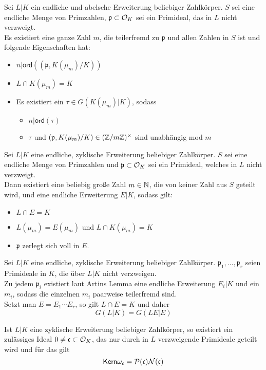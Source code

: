 \documentclass{book}
\newcommand{\Nc}{\mathcal{N}}
\newcommand{\cf}{\mathfrak{c}}
\newcommand{\pf}{\mathfrak{p}}
\begin{document}
\Lem{}
Sei $L|K$ ein endliche und abelsche Erweiterung beliebiger Zahlkörper. $S$ sei eine endliche Menge von Primzahlen, $\pf \subset \O_K$ sei ein Primideal, das in $L$ nicht verzweigt.\\
Es existiert eine ganze Zahl $m$, die teilerfremd zu $\pf$ und allen Zahlen in $S$ ist und folgende Eigenschaften hat:
\begin{itemize}
\item $n | \textsf{ord}((\pf, K(\mu_m) / K))$
\item $L\cap K(\mu_m) = K$
\item Es existiert ein $\tau \in G(K(\mu_m) | K)$, sodass
\begin{itemize}
\item $n|\textsf{ord}(\tau)$
\item $\tau$ und $(\pf, K(\mu_m)/K) \in (\Z/m\Z)^\times$ sind unabhängig mod $m$
\end{itemize}
\end{itemize} 

Sei $L|K$ eine endliche, zyklische Erweiterung beliebiger Zahlkörper. $S$ sei eine endliche Menge von Primzahlen und $\pf \subset \O_K$ sei ein Primideal, welches in $L$ nicht verzweigt.\\
Dann existiert eine beliebig große Zahl $m \in \mathbb{N}$, die von keiner Zahl aus $S$ geteilt wird, und eine endliche Erweiterung $E|K$, sodass gilt:
\begin{itemize}
\item $L\cap E = K$
\item $L(\mu_m) = E(\mu_m)$ und $L\cap K(\mu_m) = K$
\item $\pf$ zerlegt sich voll in $E$.
\end{itemize} 

\Lem{}
Sei $L|K$ eine endliche, zyklische Erweiterung beliebiger Zahlkörper. $\pf_1,\ldots, \pf_r$ seien Primideale in $K$, die über $L|K$ nicht verzweigen.\\
Zu jedem $\pf_i$ existiert laut Artins Lemma eine endliche Erweiterung $E_i|K$ und ein $m_i$, sodass die einzelnen $m_i$ paarweise teilerfremd sind.\\
Setzt man $E = E_1\cdots E_r$, so gilt $L\cap E = K$ und daher
\[G(L|K) = G(LE|E) \]

\Satz{}
Ist $L|K$ eine zyklische Erweiterung beliebiger Zahlkörper, so existiert ein zulässiges Ideal $0\neq \cf \subset \O_K$, das nur durch in $L$ verzweigende Primideale geteilt wird und für das gilt
\[ \Ker \omega_\cf = \P(\cf) \Nc(\cf) \]
\end{document}
